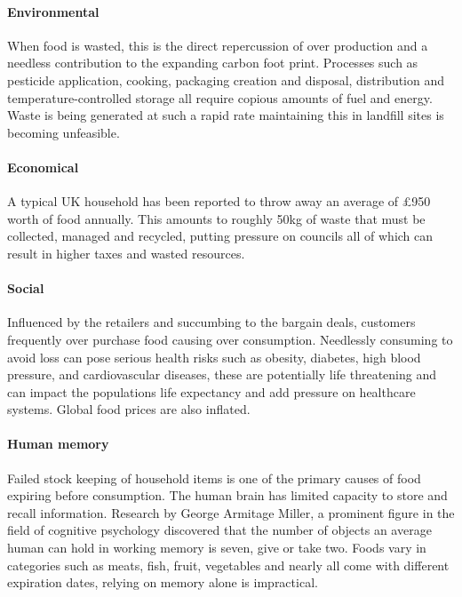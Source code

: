\documentclass[a4paper, 11pt]{article}
\begin{document}
\paragraph{Environmental}When food is wasted, this is the direct repercussion of over production and a needless contribution to the expanding carbon foot print. Processes such as pesticide application, cooking, packaging creation and disposal, distribution and temperature-controlled storage all require copious amounts of fuel and energy. Waste is being generated at such a rapid rate maintaining this in landfill sites is becoming unfeasible.\cite{waste}

\paragraph{Economical}A typical UK household has been reported to throw away an average of \pounds950 worth of food annually. This amounts to roughly 50kg of waste that must be collected, managed and recycled, putting pressure on councils all of which can result in higher taxes and wasted resources.\cite{FoodWaste}

\paragraph{Social} Influenced by the retailers and succumbing to the bargain deals, customers frequently over purchase food causing over consumption. Needlessly consuming to avoid loss can pose serious health risks such as obesity, diabetes, high blood pressure, and cardiovascular diseases, these are potentially life threatening and can impact the populations life expectancy and add pressure on healthcare systems. Global food prices are also inflated.\cite{obesity}

\paragraph{Human memory}Failed stock keeping of household items is one of the primary causes of food expiring before consumption. The human brain has limited capacity to store and recall information. Research by George Armitage Miller, a prominent figure in the field of cognitive psychology discovered that the number of objects an average human can hold in working memory is seven, give or take two.\cite{memory} Foods vary in categories such as meats, fish, fruit, vegetables and nearly all come with different expiration dates, relying on memory alone is impractical. 
\end{document}
